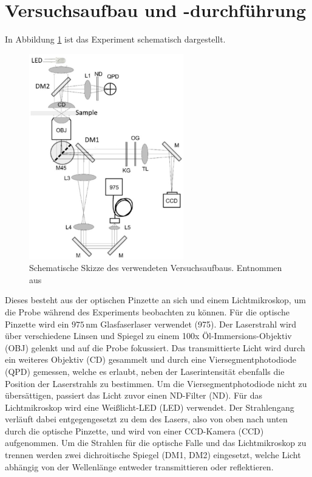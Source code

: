 \newpage
\section{Versuchsaufbau und -durchführung}
  In Abbildung \ref{fig:Aufbau} ist das Experiment schematisch dargestellt.
  \begin{figure}[h]
    \centering
    \includegraphics[width = 0.6\textwidth]{pictures/OPaufbau.png}
    \caption{Schematische Skizze des verwendeten Versuchsaufbaus. Entnommen aus \cite{tu_dortmund_versuchsanleitung_OptischePinzette}}
    \label{fig:Aufbau}
  \end{figure}
  Dieses besteht aus der optischen Pinzette an sich und einem Lichtmikroskop, um die Probe während des Experiments beobachten zu können.
  Für die optische Pinzette wird ein $975\,\text{nm}$ Glasfaserlaser verwendet (975). Der Laserstrahl wird über verschiedene Linsen und Spiegel zu einem 100x Öl-Immersions-Objektiv (OBJ) gelenkt und auf die Probe fokussiert. Das transmittierte Licht wird durch ein weiteres Objektiv (CD) gesammelt und durch eine Viersegmentphotodiode (QPD) gemessen, welche es erlaubt, neben der Laserintensität ebenfalls die Position der Laserstrahls zu bestimmen. Um die Viersegmentphotodiode nicht zu übersättigen, passiert das Licht zuvor einen ND-Filter (ND).
  Für das Lichtmikroskop wird eine Weißlicht-LED (LED) verwendet. Der Strahlengang verläuft dabei entgegengesetzt zu dem des Lasers, also von oben nach unten durch die optische Pinzette, und wird von einer CCD-Kamera (CCD) aufgenommen.
  Um die Strahlen für die optische Falle und das Lichtmikroskop zu trennen werden zwei dichroitische Spiegel (DM1, DM2) eingesetzt, welche Licht abhängig von der Wellenlänge entweder transmittieren oder reflektieren.
